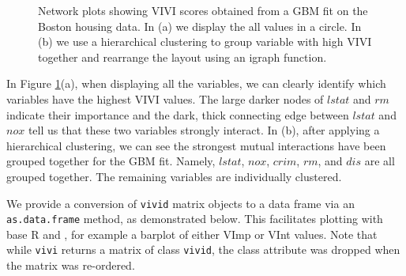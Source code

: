 \begin{figure}

{\centering {}

}

\caption{Network plots showing VIVI scores obtained from a GBM fit on the Boston housing data. In (a) we display the all values in a circle. In (b) we use a hierarchical clustering to group variable with high VIVI together and rearrange the layout using an igraph function.}\label{fig:networks1}
\end{figure}

In Figure \ref{fig:networks1}(a), when displaying all the variables, we can clearly identify which variables have the highest VIVI values. The large darker nodes of \(lstat\) and \(rm\) indicate their importance and the dark, thick connecting edge between \(lstat\) and \(nox\) tell us that these two variables strongly interact. In (b), after applying a hierarchical clustering, we can see the strongest mutual interactions have been grouped together for the GBM fit. Namely, \(lstat\), \(nox\), \(crim\), \(rm\), and \(dis\) are all grouped together. The remaining variables are individually clustered.

We provide a conversion of \texttt{vivid} matrix objects to a data frame via an \texttt{as.data.frame} method, as demonstrated below. This facilitates plotting with base R and , for example a barplot of either VImp or VInt values. Note that while \texttt{vivi} returns a matrix of class \texttt{vivid}, the class attribute was dropped when the matrix was re-ordered.

